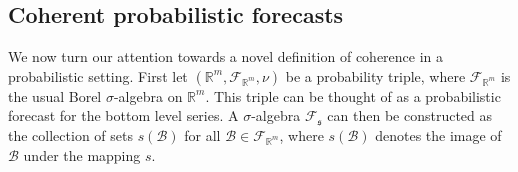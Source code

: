 \documentclass[12pt]{article}
\theoremstyle{definition}
\begin{document}
%


\subsection{Coherent probabilistic forecasts}\label{subsec:cohprobf}

We now turn our attention towards a novel definition of coherence in a probabilistic setting.  First let $(\mathbb{R}^m, \mathscr{F}_{\mathbb{R}^m}, \nu)$ be a probability triple, where $\mathscr{F}_{\mathbb{R}^m}$ is the usual Borel $\sigma$-algebra on $\mathbb{R}^m$. This triple can be thought of as a probabilistic forecast for the bottom level series.  A $\sigma$-algebra $\mathscr{F}_{\mathfrak{s}}$ can then be constructed as the collection of sets $s(\mathcal{B})$ for all $\mathcal{B}\in \mathscr{F}_{\mathbb{R}^m}$, where $s(\mathcal{B})$ denotes the image of $\mathcal{B}$ under the mapping $s$.
\end{document}
